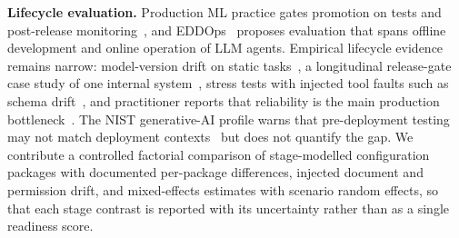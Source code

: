 \textbf{Lifecycle evaluation.}
Production ML practice gates promotion on tests and post-release monitoring~\cite{breck2017mltestscore}, and EDDOps~\cite{xia2024eddops} proposes evaluation that spans offline development and online operation of LLM agents. Empirical lifecycle evidence remains narrow: model-version drift on static tasks~\cite{chen2024chatgptdrift}, a longitudinal release-gate case study of one internal system~\cite{maiorano2026qualitygate}, stress tests with injected tool faults such as schema drift~\cite{gupta2026reliabilitybench}, and practitioner reports that reliability is the main production bottleneck~\cite{pan2026measuring}. The NIST generative-AI profile warns that pre-deployment testing may not match deployment contexts~\cite{nist2024genai600} but does not quantify the gap. We contribute a controlled factorial comparison of stage-modelled configuration packages with documented per-package differences, injected document and permission drift, and mixed-effects estimates with scenario random effects, so that each stage contrast is reported with its uncertainty rather than as a single readiness score.
